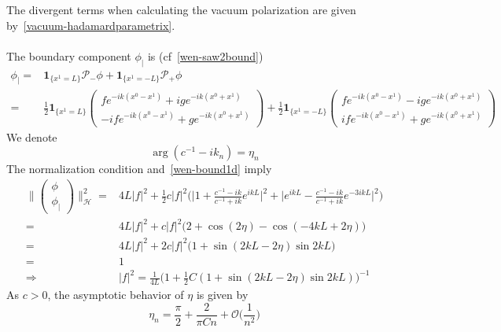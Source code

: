 The divergent terms when calculating the vacuum polarization are given by~\cref{vacuum-hadamardparametrix}. \\\\
The boundary component $\phi_|$ is (cf~\cref{wen-saw2bound})
\begin{equation*}
\begin{split}
\phi_| = & \mathbf{1}_{\{x^1 = L\}} \mathcal{P}_-\phi + \mathbf{1}_{\{x^1 = -L\}} \mathcal{P}_+\phi \\
%
= & \frac 1 2 \mathbf{1}_{\{x^1 = L\} } \begin{pmatrix} f e^{-ik(x^0 -x^1)} + ig e^{-ik(x^0 + x^1)} \\
-if e^{-ik(x^0 - x^1)} + g e^{-ik(x^0+x^1)}\end{pmatrix}
+ \frac 1 2 \mathbf{1}_{\{x^1 = - L\} } \begin{pmatrix} f e^{-ik(x^0 -x^1)} - ig e^{-ik(x^0 + x^1)} \\
if e^{-ik(x^0 - x^1)} + g e^{-ik(x^0+x^1)}\end{pmatrix} 
\end{split}
\end{equation*}
We denote
\begin{equation*}
\arg(c^{-1} - ik_n) = \eta_n
\end{equation*}
The normalization condition and~\cref{wen-bound1d} imply
\begin{equation*}
\begin{split}
\Big\| \begin{pmatrix} \phi \\  \phi_| \end{pmatrix} \Big\|^2_{\mathcal{H}}  = &
4L |f|^2 + \frac 1 2 c |f|^2 \bigg( \Big| 1 + \frac{c^{-1} - ik}{c^{-1} + ik}e^{ikL} \Big|^2
+ \Big| e^{ikL} - \frac{c^{-1} - ik}{c^{-1} + ik}e^{-3ikL} \Big|^2
\bigg) \\
%
=& 4L |f|^2 + c |f|^2 \big(2 + \cos(2\eta) - \cos(-4kL + 2\eta) \big) \\
%
=& 4L |f|^2 +2 c |f|^2 \big(1 + \sin(2kL - 2\eta) \sin 2kL  \big) \\
= & 1 \\
\Rightarrow &
|f|^2 = \frac{1}{4L} \Big( 1 + \frac 1 2 C (1 + \sin(2kL-2\eta) \sin 2kL ) \Big)^{-1}
\end{split}
\end{equation*}
As $c> 0 $, the asymptotic behavior of $\eta$ is given by
\begin{equation*}
\eta_n = \frac \pi 2 + \frac{2}{\pi Cn} + \mathcal{O}\big(\frac{1}{n^2}\big)
\end{equation*}
